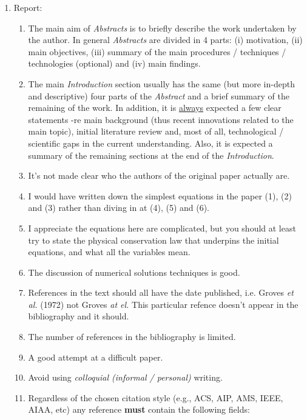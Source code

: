 \documentclass[14pt,twoside]{report}
\begin{document}
\begin{enumerate}

\item Report:
\begin{enumerate}
%
\item The main aim of {\it Abstracts} is to briefly describe the work undertaken by the author. In general {\it Abstracts} are divided in 4 parts: (i) motivation, (ii) main objectives, (iii) summary of the main procedures / techniques / technologies (optional) and (iv) main findings. 
%
\item The main {\it Introduction} section usually has the same (but more in-depth and descriptive) four parts of the {\it Abstract} and a brief summary of the remaining of the work. In addition, it is \underline{always} expected a few clear statements -re main background (thus recent innovations related to the main topic), initial literature review and, most of all, technological / scientific gaps in the current understanding. Also, it is expected a summary of the remaining sections at the end of the {\it Introduction}.
%
\item It's not made clear who the authors of the original paper actually are.
%
\item I would have written down the simplest equations in the paper (1), (2) and (3) rather than diving in at (4), (5) and (6).
%
\item I appreciate the equations here are complicated, but you should at least try to state the physical conservation law that underpins the initial equations, and what all the variables mean.
%
\item The discussion of numerical solutions techniques is good.
%
\item References in the text should all have the date published, i.e. Groves {\it et al.} (1972) not Groves {\it at el.} This particular refence doesn't appear in the bibliography and it should.
%
\item The number of references in the bibliography is limited.
%
\item A good attempt at a difficult paper.
%
%
\item Avoid using {\it colloquial (informal / personal)} writing.
%
\item Regardless of the chosen citation style (e.g., ACS, AIP, AMS, IEEE, AIAA, etc) any reference {\bf must} contain the following fields: 

\end{enumerate}
\end{enumerate}
\end{document}
